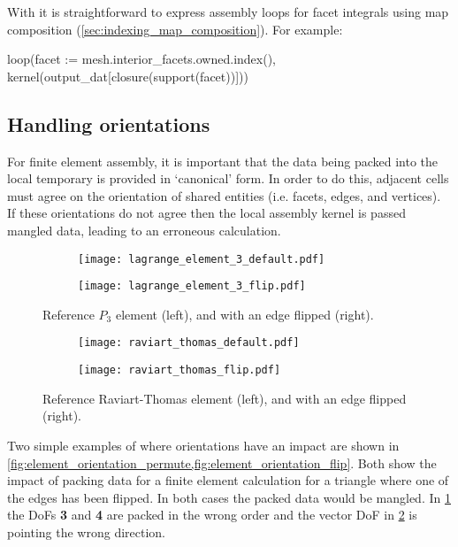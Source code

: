 \documentclass[thesis]{subfiles}
\begin{document}
With  it is straightforward to express assembly loops for facet integrals using map composition (\cref{sec:indexing_map_composition}).
For example:
\begin{pyinline}
  loop(facet := mesh.interior_facets.owned.index(),
       kernel(output_dat[closure(support(facet))]))
\end{pyinline}

\subsection{Handling orientations}
\label{sec:firedrake_orientations}

For finite element assembly, it is important that the data being packed into the local temporary is provided in `canonical' form.
In order to do this, adjacent cells must agree on the orientation of shared entities (i.e. facets, edges, and vertices).
If these orientations do not agree then the local assembly kernel is passed mangled data, leading to an erroneous calculation.

\begin{figure}
  \centering
  \begin{subfigure}{0.45\textwidth}
    \centering
    \texttt{[image: lagrange\_element\_3\_default.pdf]}
  \end{subfigure}
  \begin{subfigure}{0.45\textwidth}
    \centering
    \texttt{[image: lagrange\_element\_3\_flip.pdf]}
  \end{subfigure}
  \caption{Reference $P_3$ element (left), and with an edge flipped (right).}
  \label{fig:element_orientation_permute}
\end{figure}

\begin{figure}
  \centering
  \begin{subfigure}{0.45\textwidth}
    \centering
    \texttt{[image: raviart\_thomas\_default.pdf]}
  \end{subfigure}
  \begin{subfigure}{0.45\textwidth}
    \centering
    \texttt{[image: raviart\_thomas\_flip.pdf]}
  \end{subfigure}
  \caption{Reference Raviart-Thomas element (left), and with an edge flipped (right).}
  \label{fig:element_orientation_flip}
\end{figure}

Two simple examples of where orientations have an impact are shown in \cref{fig:element_orientation_permute,fig:element_orientation_flip}.
Both show the impact of packing data for a finite element calculation for a triangle where one of the edges has been flipped.
In both cases the packed data would be mangled.
In \cref{fig:element_orientation_permute} the DoFs \textbf{3} and \textbf{4} are packed in the wrong order and the vector DoF in \cref{fig:element_orientation_flip} is pointing the wrong direction.
\end{document}
